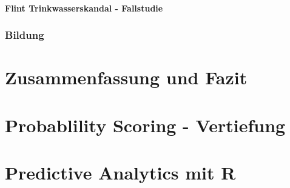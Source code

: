\documentclass[12pt,a4paper,listof=totoc,oneside]{scrreprt}
\begin{document}
\subsubsection{Flint Trinkwasserskandal - Fallstudie}

\subsection{Bildung}


\chapter{Zusammenfassung und Fazit}

\appendix
\chapter{Probablility Scoring - Vertiefung}


\chapter{Predictive Analytics mit R}







\listoffigures
\listoftables
\printglossary[title=Glossar]
\printglossary[type=\acronymtype, title=Akronyme]

{}

\end{document}
